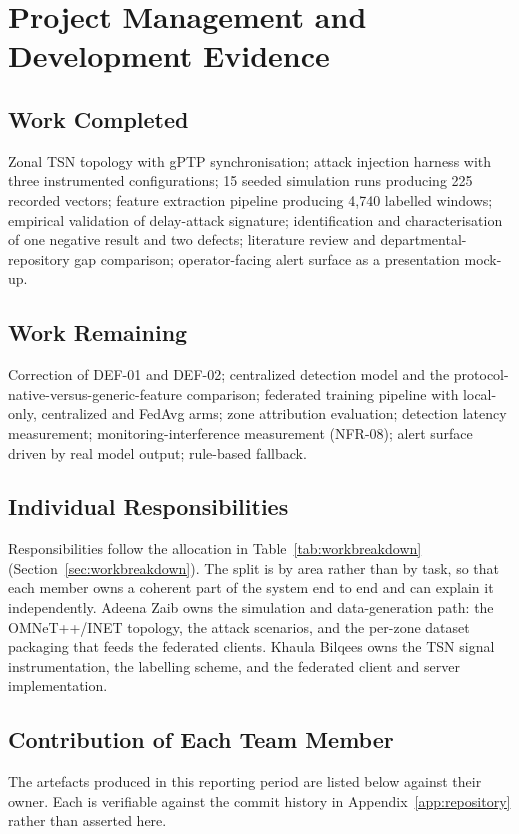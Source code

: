 \chapter{Project Management and Development Evidence}

\section{Work Completed}
Zonal TSN topology with gPTP synchronisation; attack injection harness with three
instrumented configurations; 15 seeded simulation runs producing 225 recorded
vectors; feature extraction pipeline producing 4{,}740 labelled windows; empirical
validation of delay-attack signature; identification and characterisation of one
negative result and two defects; literature review and departmental-repository gap
comparison; operator-facing alert surface as a presentation mock-up.

\section{Work Remaining}
Correction of DEF-01 and DEF-02; centralized detection model and the
protocol-native-versus-generic-feature comparison; federated training pipeline with
local-only, centralized and FedAvg arms; zone attribution evaluation; detection
latency measurement; monitoring-interference measurement (NFR-08); alert surface
driven by real model output; rule-based fallback.

\section{Individual Responsibilities}
Responsibilities follow the allocation in Table~\ref{tab:workbreakdown}
(Section~\ref{sec:workbreakdown}). The split is by area rather than by task, so that each member owns a
coherent part of the system end to end and can explain it independently. Adeena Zaib
owns the simulation and data-generation path: the OMNeT++/INET topology, the attack
scenarios, and the per-zone dataset packaging that feeds the federated clients.
Khaula Bilqees owns the TSN signal instrumentation, the labelling scheme, and the
federated client and server implementation.

\section{Contribution of Each Team Member}
The artefacts produced in this reporting period are listed below against their owner.
Each is verifiable against the commit history in Appendix~\ref{app:repository} rather than asserted here.

